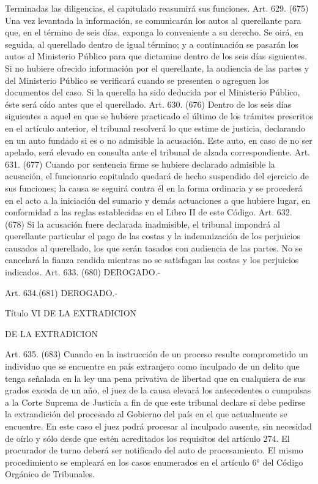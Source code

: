     Terminadas las diligencias, el capitulado reasumirá sus funciones.
    Art. 629. (675) Una vez levantada la información, se comunicarán los autos al querellante para que, en el término de seis días, exponga lo conveniente a su derecho. Se oirá, en seguida, al querellado dentro de igual término; y a continuación se pasarán los autos al Ministerio Público para que dictamine dentro de los seis días siguientes.
    Si no hubiere ofrecido información por el querellante, la audiencia de las partes y del Ministerio Público se verificará cuando se presenten o agreguen los documentos del caso.
    Si la querella ha sido deducida por el Ministerio Público, éste será oído antes que el querellado.
    Art. 630. (676) Dentro de los seis días siguientes a aquel en que se hubiere practicado el último de los trámites prescritos en el artículo anterior, el tribunal resolverá lo que estime de justicia, declarando en un auto fundado si es o no admisible la acusación.
    Este auto, en caso de no ser apelado, será elevado en consulta ante el tribunal de alzada correspondiente.
    Art. 631. (677) Cuando por sentencia firme se hubiere declarado admisible la acusación, el funcionario capitulado quedará de hecho suspendido del ejercicio de sus funciones; la causa se seguirá contra él en la forma ordinaria y se procederá en el acto a la iniciación del sumario y demás actuaciones a que hubiere lugar, en conformidad a las reglas establecidas en el Libro II de este Código.
    Art. 632. (678) Si la acusación fuere declarada inadmisible, el tribunal impondrá al querellante particular el pago de las costas y la indemnización de los perjuicios causados al querellado, los que serán tasados con audiencia de las partes.
    No se cancelará la fianza rendida mientras no se satisfagan las costas y los perjuicios indicados.
    Art. 633. (680) DEROGADO.-


    Art. 634.(681) DEROGADO.-


    Título VI
    DE LA EXTRADICION


    DE LA EXTRADICION


    Art. 635. (683) Cuando en la instrucción de un proceso resulte comprometido un individuo que se encuentre en país extranjero como inculpado de un delito que tenga señalada en la ley una pena privativa de libertad que en cualquiera de sus grados exceda de un año, el juez de la causa elevará los antecedentes o cumpulsas a la Corte Suprema de Justicia a fin de que este tribunal declare si debe pedirse la extrandición del procesado al Gobierno del país en el que actualmente se encuentre.
    En este caso el juez podrá procesar al inculpado ausente, sin necesidad de oírlo y sólo desde que estén acreditados los requisitos del artículo 274. El procurador de turno deberá ser notificado del auto de procesamiento. El mismo procedimiento se empleará en los casos enumerados en el artículo 6° del Código Orgánico de Tribunales.


